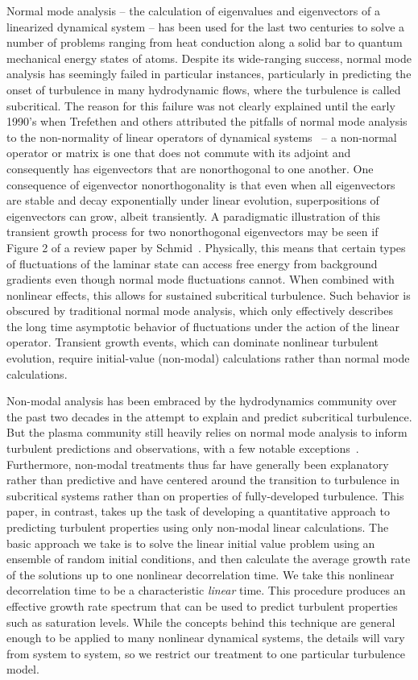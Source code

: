 \documentclass[showpacs,preprintnumbers,amsmath,amssymb,superscriptaddress,aip]{revtex4-1}
\begin{document}
Normal mode analysis -- the calculation of eigenvalues and eigenvectors of a linearized dynamical system -- has been used for the last two centuries to solve a number of problems ranging from
heat conduction along a solid bar to quantum mechanical energy states of atoms. Despite its wide-ranging success, normal mode analysis has seemingly failed in particular instances,
particularly in predicting the onset of turbulence in many hydrodynamic flows, where the turbulence is called subcritical. 
The reason for this failure was not clearly explained until the early 1990's when Trefethen and others attributed the pitfalls of normal mode analysis to the non-normality of linear operators of
dynamical systems~\cite{trefethen1993,trefethen2005} -- a non-normal operator or matrix is one that does not commute with its adjoint and consequently has 
eigenvectors that are nonorthogonal to one another. One consequence of eigenvector nonorthogonality is that even when all eigenvectors are stable and decay exponentially under linear evolution, 
superpositions of eigenvectors can grow, albeit transiently.
A paradigmatic illustration of this transient growth process for two nonorthogonal eigenvectors may be seen if Figure 2 of a review paper by Schmid~\cite{schmid2007}.
Physically, this means that certain types of fluctuations of the laminar state can access free energy from background gradients even though normal mode fluctuations cannot.
When combined with nonlinear effects, this allows for sustained subcritical turbulence.
Such behavior is obscured by traditional normal mode analysis, which only effectively describes the long time asymptotic behavior of fluctuations under the 
action of the linear operator. Transient growth events, which can dominate nonlinear turbulent evolution, require initial-value (non-modal) calculations rather than normal mode calculations.

Non-modal analysis has been embraced by the hydrodynamics community over the past two decades in the attempt to explain and predict subcritical turbulence. But the plasma community
still heavily relies on normal mode analysis to inform turbulent predictions and observations, with a few notable exceptions~\cite{camargo1998,camporeale2010,schekochihin2012}. 
Furthermore, non-modal treatments thus far have generally been explanatory rather than predictive and have centered around the transition to turbulence in subcritical systems rather 
than on properties of fully-developed turbulence.
This paper, in contrast, takes up the task of developing a quantitative approach to predicting turbulent properties using only non-modal linear calculations. 
The basic approach we take is to solve the linear initial value problem using an ensemble of random initial conditions, 
and then calculate the average growth rate of the solutions up to one nonlinear decorrelation time. We take this nonlinear decorrelation time to be a characteristic \emph{linear} time.
This procedure produces an effective growth rate spectrum that can be used to predict turbulent properties such as saturation levels.
While the concepts behind this technique are general enough to be applied to many nonlinear dynamical systems, the details will vary from system to system, 
so we restrict our treatment to one particular turbulence model.
\end{document}
